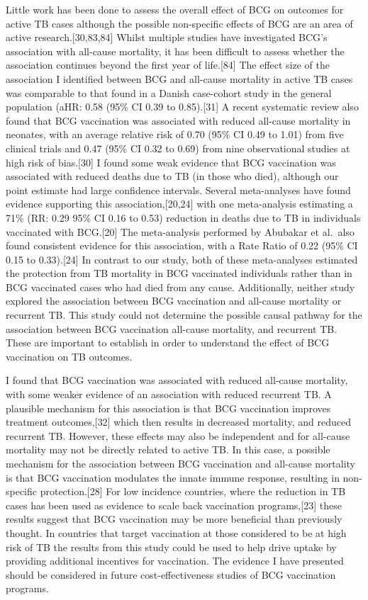 \documentclass[11pt,twoside]{bristolthesis}
\begin{document}
  Little work has been done to assess the overall effect of BCG on outcomes for active TB cases although the possible non-specific effects of BCG are an area of active research.{[}30,83,84{]} Whilst multiple studies have investigated BCG's association with all-cause mortality, it has been difficult to assess whether the association continues beyond the first year of life.{[}84{]} The effect size of the association I identified between BCG and all-cause mortality in active TB cases was comparable to that found in a Danish case-cohort study in the general population (aHR: 0.58 (95\% CI 0.39 to 0.85).{[}31{]} A recent systematic review also found that BCG vaccination was associated with reduced all-cause mortality in neonates, with an average relative risk of 0.70 (95\% CI 0.49 to 1.01) from five clinical trials and 0.47 (95\% CI 0.32 to 0.69) from nine observational studies at high risk of bias.{[}30{]} I found some weak evidence that BCG vaccination was associated with reduced deaths due to TB (in those who died), although our point estimate had large confidence intervals. Several meta-analyses have found evidence supporting this association,{[}20,24{]} with one meta-analysis estimating a 71\% (RR: 0.29 95\% CI 0.16 to 0.53) reduction in deaths due to TB in individuals vaccinated with BCG.{[}20{]} The meta-analysis performed by Abubakar et al.~also found consistent evidence for this association, with a Rate Ratio of 0.22 (95\% CI 0.15 to 0.33).{[}24{]} In contrast to our study, both of these meta-analyses estimated the protection from TB mortality in BCG vaccinated individuals rather than in BCG vaccinated cases who had died from any cause. Additionally, neither study explored the association between BCG vaccination and all-cause mortality or recurrent TB. This study could not determine the possible causal pathway for the association between BCG vaccination all-cause mortality, and recurrent TB. These are important to establish in order to understand the effect of BCG vaccination on TB outcomes.
  
  I found that BCG vaccination was associated with reduced all-cause mortality, with some weaker evidence of an association with reduced recurrent TB. A plausible mechanism for this association is that BCG vaccination improves treatment outcomes,{[}32{]} which then results in decreased mortality, and reduced recurrent TB. However, these effects may also be independent and for all-cause mortality may not be directly related to active TB. In this case, a possible mechanism for the association between BCG vaccination and all-cause mortality is that BCG vaccination modulates the innate immune response, resulting in non-specific protection.{[}28{]} For low incidence countries, where the reduction in TB cases has been used as evidence to scale back vaccination programs,{[}23{]} these results suggest that BCG vaccination may be more beneficial than previously thought. In countries that target vaccination at those considered to be at high risk of TB the results from this study could be used to help drive uptake by providing additional incentives for vaccination. The evidence I have presented should be considered in future cost-effectiveness studies of BCG vaccination programs.
  
\end{document}
